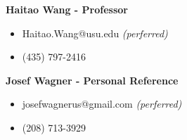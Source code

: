 \documentclass[letterpaper,11pt]{article}
\begin{document}
\textbf{Haitao Wang - Professor}
\begin{itemize}[noitemsep,topsep=0pt]
	\item Haitao.Wang@usu.edu \textit{(perferred)}
	\item (435) 797-2416\\
\end{itemize}

\textbf{Josef Wagner - Personal Reference}
\begin{itemize}[noitemsep,topsep=0pt]
	\item josefwagnerus@gmail.com \textit{(perferred)}
	\item (208) 713-3929
\end{itemize}


\end{document}
